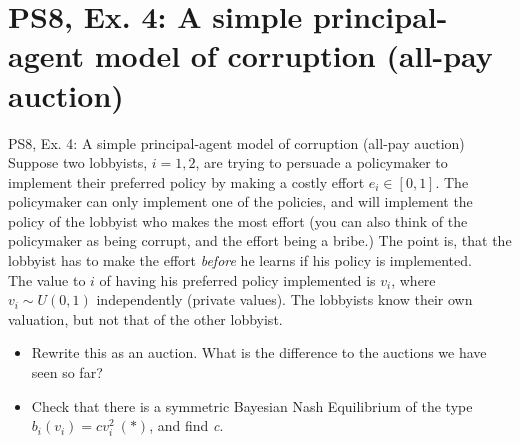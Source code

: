 \section{PS8, Ex. 4: A simple principal-agent model of corruption (all-pay auction)}

\begin{frame}{PS8, Ex. 4: A simple principal-agent model of corruption (all-pay auction)}
    Suppose two lobbyists, $i = 1, 2$, are trying to persuade a policymaker to implement their preferred policy by making a costly effort $e_i\in[0, 1]$. The policymaker can only implement one of the policies, and will implement the policy of the lobbyist who makes the most effort (you can also think of the policymaker as being corrupt, and the effort being a bribe.) The point is, that the lobbyist has to make the effort \textit{before} he learns if his policy is implemented.\\\medskip
    The value to $i$ of having his preferred policy implemented is $v_i$, where $v_i\sim U(0, 1)$ independently (private values). The lobbyists know their own valuation, but not that of the other lobbyist.
    \begin{itemize}
      \item[(a)] Rewrite this as an auction. What is the difference to the auctions we have seen so far?
      \item[(b)] Check that there is a symmetric Bayesian Nash Equilibrium of the type $b_i(v_i) = cv_i^2\ (*)$, and find \textit{c}.
    \end{itemize}
\end{frame}

